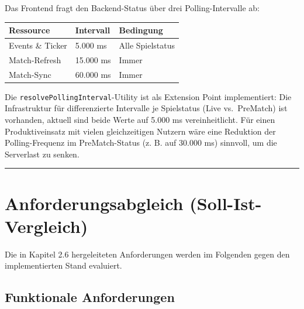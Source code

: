Das Frontend fragt den Backend-Status über drei Polling-Intervalle ab:

{\def\LTcaptype{none} %
\begin{longtable}[]{@{}lll@{}}
\toprule\noalign{}
Ressource & Intervall & Bedingung \\
\midrule\noalign{}
\endhead
\bottomrule\noalign{}
\endlastfoot
Events \& Ticker & 5.000 ms & Alle Spielstatus \\
Match-Refresh & 15.000 ms & Immer \\
Match-Sync & 60.000 ms & Immer \\
\end{longtable}
}

Die \texttt{resolvePollingInterval}-Utility ist als Extension Point
implementiert: Die Infrastruktur für differenzierte Intervalle je
Spielstatus (Live vs.~PreMatch) ist vorhanden, aktuell sind beide Werte
auf 5.000 ms vereinheitlicht. Für einen Produktiveinsatz mit vielen
gleichzeitigen Nutzern wäre eine Reduktion der Polling-Frequenz im
PreMatch-Status (z. B. auf 30.000 ms) sinnvoll, um die Serverlast zu
senken.

\begin{center}\rule{0.5\linewidth}{0.5pt}\end{center}

\section{Anforderungsabgleich
(Soll-Ist-Vergleich)}\label{anforderungsabgleich-soll-ist-vergleich}

Die in Kapitel 2.6 hergeleiteten Anforderungen werden im Folgenden gegen
den implementierten Stand evaluiert.

\subsection{Funktionale
Anforderungen}\label{funktionale-anforderungen}

